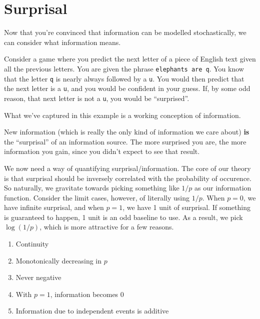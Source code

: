 \documentclass[13pt,oneside]{tufte-book}
\providecommand{\tightlist}{%
  \setlength{\itemsep}{0pt}\setlength{\parskip}{0pt}}
\theoremstyle{definition}
\theoremstyle{definition}
\theoremstyle{definition}
\theoremstyle{remark}
\let\BeginKnitrBlock\begin \let\EndKnitrBlock\end
\begin{document}
\section{Surprisal}\label{surprisal}

Now that you're convinced that information can be modelled
stochastically, we can consider what information means.

\BeginKnitrBlock{example}[The Q-U Question]
\protect\hypertarget{exm:unnamed-chunk-28}{}{\label{exm:unnamed-chunk-28}
{} } Consider a game where you predict
the next letter of a piece of English text given all the previous
letters. You are given the phrase \texttt{elephants\ are\ q}. You know
that the letter \texttt{q} is nearly always followed by a \texttt{u}.
You would then predict that the next letter is a \texttt{u}, and you
would be confident in your guess. If, by some odd reason, that next
letter is not a \texttt{u}, you would be ``surprised''.
\EndKnitrBlock{example}

What we've captured in this example is a working conception of
information.

\BeginKnitrBlock{definition}[Information]
\protect\hypertarget{def:unnamed-chunk-29}{}{\label{def:unnamed-chunk-29}
{} } New information (which is really the only
kind of information we care about) \textbf{is} the ``surprisal'' of an
information source. The more surprised you are, the more information you
gain, since you didn't expect to see that result.
\EndKnitrBlock{definition}

We now need a way of quantifying surprisal/information. The core of our
theory is that surprisal should be inversely correlated with the
probability of occurence. So naturally, we gravitate towards picking
something like \(1/p\) as our information function. Consider the limit
cases, however, of literally using \(1/p\). When \(p=0\), we have
infinite surprisal, and when \(p=1\), we have 1 unit of surprisal. If
something is guaranteed to happen, 1 unit is an odd baseline to use. As
a result, we pick \(\log(1/p)\), which is more attractive for a few
reasons.

\begin{enumerate}
\def\labelenumi{\arabic{enumi}.}
\tightlist
\item
  Continuity
\item
  Monotonically decreasing in \(p\)
\item
  Never negative
\item
  With \(p=1\), information becomes 0
\item
  Information due to independent events is additive
\end{enumerate}
\end{document}
